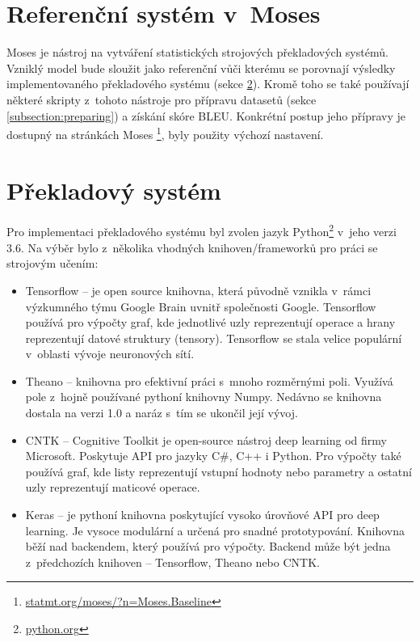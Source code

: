 \section{Referenční systém v~Moses}\label{section:referent}
Moses \cite{moses} je nástroj na vytváření statistických strojových překladových systémů. Vzniklý model bude sloužit jako referenční vůči kterému se porovnají výsledky implementovaného překladového systému (sekce \ref{section:nmtSystem}). Kromě toho se také používají některé skripty z~tohoto nástroje pro přípravu datasetů (sekce \ref{subsection:preparing}) a získání skóre BLEU. Konkrétní postup jeho přípravy je dostupný na stránkách Moses \footnote{\url{statmt.org/moses/?n=Moses.Baseline}}, byly použity výchozí nastavení.

\section{Překladový systém}\label{section:nmtSystem}
Pro implementaci překladového systému byl zvolen jazyk Python\footnote{\url{python.org}} v~jeho verzi 3.6. Na výběr bylo z~několika vhodných knihoven/frameworků pro práci se strojovým učením:

\begin{itemize}
  \item Tensorflow -- je open source knihovna, která původně vznikla v~rámci výzkumného týmu Google Brain uvnitř společnosti Google. Tensorflow používá pro výpočty graf, kde jednotlivé uzly reprezentují operace a hrany reprezentují datové struktury (tensory). Tensorflow se stala velice populární v~oblasti vývoje neuronových sítí.
  \item Theano -- knihovna pro efektivní práci s~mnoho rozměrnými poli. Využívá pole z~hojně používané pythoní knihovny Numpy. Nedávno se knihovna dostala na verzi 1.0 a naráz s~tím se ukončil její vývoj.
  \item CNTK -- Cognitive Toolkit je open-source nástroj deep learning od firmy Microsoft. Poskytuje API pro jazyky C\#, C++ i Python. Pro výpočty také používá graf, kde listy reprezentují vstupní hodnoty nebo parametry a ostatní uzly reprezentují maticové operace.
  \item Keras -- je pythoní knihovna poskytující vysoko úrovňové API pro deep learning. Je vysoce modulární a určená pro snadné prototypování. Knihovna běží nad backendem, který používá pro výpočty. Backend může být jedna z~předchozích knihoven -- Tensorflow, Theano nebo CNTK.
\end{itemize}


